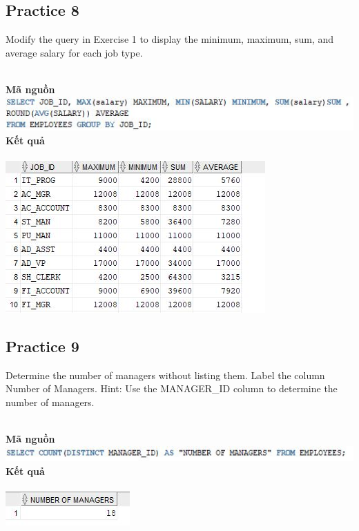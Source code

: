 \documentclass[12pt,a4paper]{report}
\begin{document}
\subsection{Practice 8}
\begin{boxedminipage}[t]{15.5cm}
	Modify the query in Exercise 1 to display the minimum, maximum, sum, and average salary for each job type.
\end{boxedminipage}
\newline
\\
\textbf{Mã nguồn}
\\
\newline
\includegraphics[scale=1]{85.jpg}\\
\textbf{Kết quả}\\\\
\includegraphics[scale=1]{k85.jpg}

\subsection{Practice 9}
\begin{boxedminipage}[t]{15.5cm}
	 Determine the number of managers without listing them. Label the column Number of Managers. 
	Hint: Use the MANAGER\_ID column to determine the number of managers.
\end{boxedminipage}
\newline
\\
\textbf{Mã nguồn}
\\
\newline
\includegraphics[scale=1]{95.jpg}\\
\textbf{Kết quả}\\\\
\includegraphics[scale=1]{k95.jpg}
\end{document}
